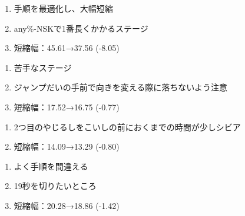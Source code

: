 \begin{enumerate}[label={\sarrow}]
\item 手順を最適化し、大幅短縮
\item any\%-NSKで1番長くかかるステージ
\item 短縮幅：45.61→37.56 (-8.05)
\end{enumerate}



\begin{enumerate}[label={\sarrow}]
\item 苦手なステージ
\item ジャンプだいの手前で向きを変える際に落ちないよう注意
\item 短縮幅：17.52→16.75 (-0.77)
\end{enumerate}



\begin{enumerate}[label={\sarrow}]
\item 2つ目のやじるしをこいしの前におくまでの時間が少しシビア
\item 短縮幅：14.09→13.29 (-0.80)
\end{enumerate}



\begin{enumerate}[label={\sarrow}]
\item よく手順を間違える
\item 19秒を切りたいところ
\item 短縮幅：20.28→18.86 (-1.42)
\end{enumerate}



